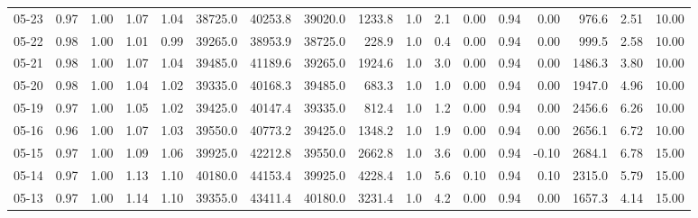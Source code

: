 \begin{threeparttable}
{\begin{tabular}{lrrrrrrrrrrrrrrrr}
  05-23 &         0.97 &           1.00 &          1.07 &          1.04 & 38725.0 & 40253.8 & 39020.0 &     1233.8 &                      1.0 &                 2.1 &       0.00 &      0.94 &           0.00 &            976.6 &            2.51 &                  10.00 \\
  05-22 &         0.98 &           1.00 &          1.01 &          0.99 & 39265.0 & 38953.9 & 38725.0 &      228.9 &                      1.0 &                 0.4 &       0.00 &      0.94 &           0.00 &            999.5 &            2.58 &                  10.00 \\
  05-21 &         0.98 &           1.00 &          1.07 &          1.04 & 39485.0 & 41189.6 & 39265.0 &     1924.6 &                      1.0 &                 3.0 &       0.00 &      0.94 &           0.00 &           1486.3 &            3.80 &                  10.00 \\
  05-20 &         0.98 &           1.00 &          1.04 &          1.02 & 39335.0 & 40168.3 & 39485.0 &      683.3 &                      1.0 &                 1.0 &       0.00 &      0.94 &           0.00 &           1947.0 &            4.96 &                  10.00 \\
  05-19 &         0.97 &           1.00 &          1.05 &          1.02 & 39425.0 & 40147.4 & 39335.0 &      812.4 &                      1.0 &                 1.2 &       0.00 &      0.94 &           0.00 &           2456.6 &            6.26 &                  10.00 \\
  05-16 &         0.96 &           1.00 &          1.07 &          1.03 & 39550.0 & 40773.2 & 39425.0 &     1348.2 &                      1.0 &                 1.9 &       0.00 &      0.94 &           0.00 &           2656.1 &            6.72 &                  10.00 \\
  05-15 &         0.97 &           1.00 &          1.09 &          1.06 & 39925.0 & 42212.8 & 39550.0 &     2662.8 &                      1.0 &                 3.6 &       0.00 &      0.94 &          -0.10 &           2684.1 &            6.78 &                  15.00 \\
  05-14 &         0.97 &           1.00 &          1.13 &          1.10 & 40180.0 & 44153.4 & 39925.0 &     4228.4 &                      1.0 &                 5.6 &       0.10 &      0.94 &           0.10 &           2315.0 &            5.79 &                  15.00 \\
  05-13 &         0.97 &           1.00 &          1.14 &          1.10 & 39355.0 & 43411.4 & 40180.0 &     3231.4 &                      1.0 &                 4.2 &       0.00 &      0.94 &           0.00 &           1657.3 &            4.14 &                  15.00 \\

\end{tabular}}
\end{threeparttable}
